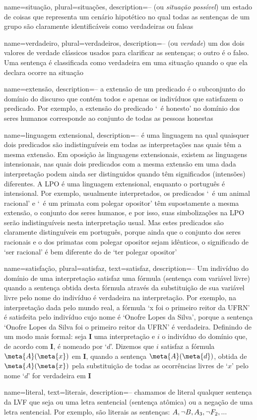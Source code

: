 {
 name=situação,
 plural=situações,
 description={-- (ou \textit{situação possível}) um estado de coisas que representa um cenário hipotético no qual todas as sentenças de um grupo são claramente identificáveis como verdadeiras ou falsas}
}


{
name=verdadeiro,
plural=verdadeiros,
description={-- (ou \textit{verdade}) um dos dois valores de verdade clássicos usados para clarificar as sentenças; o outro é o falso. Uma sentença é classificada como verdadeira em uma situação quando o que ela declara ocorre na situação}
}


{
name=extensão,
description={-- a extensão de um predicado é o subconjunto do domínio do discurso que contém todos e apenas os indivíduos que satisfazem o predicado. Por exemplo, a extensão do predicado `\blank\ é honesto' no domínio dos seres humanos corresponde ao conjunto de todas as pessoas honestas}
}


{
name=linguagem extensional,
description={-- é uma linguagem na qual quaisquer dois predicados são indistinguíveis em todas  as interpretações nas quais têm a mesma  extensão. Em oposição às linguagens extensionais, existem as linguagens intensionais, nas quais dois predicados com a mesma extensão em uma dada interpretação podem ainda ser distinguidos quando têm significados (intensões) diferentes. A LPO é uma linguagem extensional, enquanto o português é intensional. Por exemplo, usualmente interpretados, os predicados `\blank\ é um animal racional' e `\blank\ é um primata com polegar opositor' têm supostamente a mesma extensão, o conjunto dos seres humanos, e por isso, suas simbolizações na LPO serão indistinguíveis nesta interpretação usual. Mas estes predicados são claramente distinguíveis em português, porque ainda que o conjunto dos seres racionais e o dos primatas com polegar opositor sejam idênticos, o significado de  `ser racional' é bem diferente do de `ter polegar opositor'}
}


{
 name=satisfação,
 plural=satisfaz,
 text=satisfaz,
 description={-- Um indivíduo do domínio de uma interpretação satisfaz uma fórmula (sentença com variável livre) quando a sentença obtida desta fórmula através da substituição de sua variável livre pelo nome do indivíduo é verdadeira na interpretação. Por exemplo, na interpretação dada pelo mundo real, a fórmula `x foi o primeiro reitor da UFRN' é satisfeita pelo indivíduo cujo nome é `Onofre Lopes da Silva', porque a sentença `Onofre Lopes da Silva foi o primeiro reitor da UFRN' é verdadeira. Definindo de um modo mais formal: seja $\mathbf{I}$ uma interpretação e $i$ o indivíduo do domínio que, de acordo com $\mathbf{I}$, é nomeado por `$d$'. Dizemos que $i$ satisfaz a fórmula $\meta{A}(\meta{x})$ em $\mathbf{I}$, quando a sentença $\meta{A}(\meta{d})$, obtida de $\meta{A}(\meta{x})$ pela substituição de todas as ocorrências livres de `$x$' pelo nome `$d$' for verdadeira em $\mathbf{I}$}
}

{
name=literal,
text=literais,
description={-- chamamos de literal qualquer sentença da LVF que seja ou uma letra sentencial (sentença atômica) ou a negação de uma letra sentencial. Por exemplo, são literais as sentenças: $A, \neg B, A_3, \neg F_2, ...$}
}